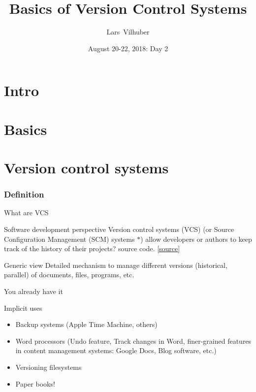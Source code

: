 \documentclass[xcolor=table,compress]{beamer}
\title[Basics of VCS]{Basics of Version Control Systems}
\author[Vilhuber]{%
  Lars~Vilhuber\inst{1}
}
\institute[Cornell]{
  \inst{1}%
   Cornell University, Economics Department,
}%
\date[August 20-22, 2018]{August 20-22, 2018: Day 2}
\begin{document}
\frame{\titlepage}
\section{Intro}
\section{Basics}
\section[VCS]{Version control systems}


\subsubsection{Definition}

\begin{frame}{What are VCS}
\begin{block}{Software development perspective}
Version control systems (VCS) (or Source Configuration Management (SCM) systems $*$) allow developers or authors to keep track of the history of their projects? source code. [\href{http://better-scm.shlomifish.org/}{source}]

\end{block}
\pause
\begin{block}{Generic view}
Detailed mechanism to manage different versions (historical, parallel) of documents, files, programs, etc.
\end{block}
\end{frame}



\begin{frame}{You already have it}
\begin{block}{Implicit uses}
\begin{itemize}
\item Backup systems (Apple Time Machine, others)
\item Word processors (Undo feature, Track changes in Word, finer-grained features in content management systems: Google Docs, Blog software, etc.)
\item Versioning filesystems
\item Paper books!
\end{itemize}
\end{block}
\end{frame}
\end{document}
